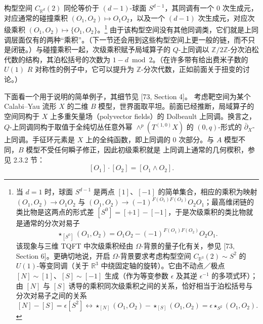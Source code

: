 构型空间 $C_{\mathbb{R}^d}(2)$ 同伦等价于 $(d-1)$-球面 $S^{d-1}$，其同调有一个 0 次生成元，对应通常的碰撞乘积 $(O_1,O_2)\mapsto O_1O_2$，以及一个 $(d-1)$ 次生成元，对应次级乘积 $(O_1,O_2)\mapsto \{O_1,O_2\}$。\footnote{当 $d=1$ 时，球面 $S^{d-1}$ 是两点 $[1]$、$[-1]$ 的简单集合，相应的乘积为映射 $(O_1,O_2)\to O_1O_2$ 与 $(O_1,O_2)\to (-1)^{F(O_1)F(O_2)}O_2O_1$；最高维闭链的类比物是这两点的形式差 $[S^0] = [+1]-[-1]$，于是次级乘积的类比物就是通常的分次对易子
\[
\star_{[S^0]}(O_1,O_2) = O_1O_2 - (-1)^{F(O_1)F(O_2)}O_2O_1 .
\]
该现象与三维 TQFT 中次级乘积经由 $\Omega$-背景的量子化有关，参见 [73, Section 6]。更确切地说，开启 $\Omega$-背景要求考虑构型空间 $C_{\mathbb{R}^3}(2)\sim S^2$ 的 $U(1)$-等变同调（关于 $\mathbb{R}^3$ 中绕固定轴的旋转）。它由不动点／极点 $[N]\sim[1]$、$[S]\sim[-1]$ 生成（作为等变参数 $\epsilon$ 及其逆 $\epsilon^{-1}$ 的多项式环）；由 $[N]$ 与 $[S]$ 诱导的乘积同次级乘积之间的关系，恰好相当于泊松括号与分次对易子之间的关系
\[
[N]-[S] = \epsilon[S^2] \leftrightarrow \star_{[N]}(O_1,O_2) - \star_{[S]}(O_1,O_2) = \epsilon \star_{S^2}(O_1,O_2) .
\]}
由于该构型空间没有其他同调类，它们就是上同调层面仅有的两种“乘积”。（下一节还会用到这些构型空间上更一般的链，而不只是闭链。）与碰撞乘积一起，次级乘积赋予局域算子的 $Q$-上同调以 $\mathbb{Z}/2\mathbb{Z}$-分次泊松代数的结构，其泊松括号的次数为 $1-d \bmod 2$。（在许多带有给出费米子数的 $U(1)$ $R$ 对称性的例子中，它可以提升为 $\mathbb{Z}$-分次代数，正如前面关于扭变的讨论。）

下面看一个用于说明的简单例子，其细节见 [73, Section 4]。
考虑靶空间为某个 Calabi--Yau 流形 $X$ 的二维 $B$ 模型，世界面取平坦。前面已经推断，局域算子的空间同构于 $X$ 上多重矢量场（polyvector fields）的 Dolbeault 上同调。换言之，$Q$-上同调同构于取值于全纯切丛任意外幂 $\wedge^p(T^{(1,0)}X)$ 的 $(0,q)$-形式的 $\bar\partial_X$-上同调。手征环元素是 $X$ 上的全纯函数，即上同调的 0 次部分。与 $A$ 模型不同，$B$ 模型不受任何瞬子修正，因此初级乘积就是
上同调上通常的几何楔积，参见 2.3.2 节：
\begin{equation}\tag{3.12}
[O_1]\cdot[O_2] = [O_1\wedge O_2].
\end{equation}

